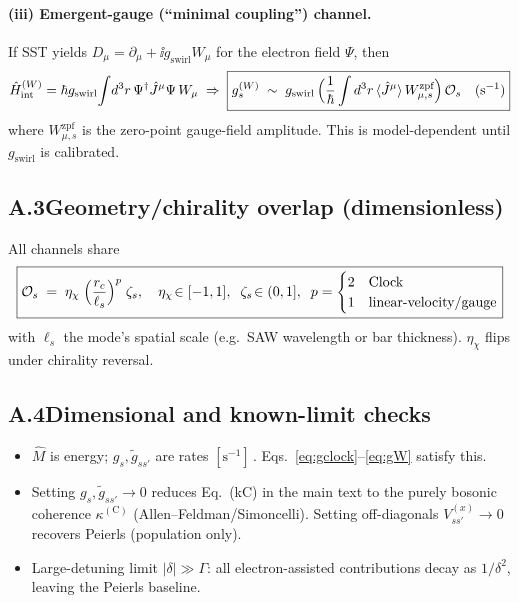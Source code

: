 \documentclass[aps,prb,preprint,amsmath,amssymb]{revtex4-2} %
\newcommand{\rc}{r_c}
\begin{document}
        \paragraph*{(iii) Emergent-gauge (“minimal coupling”) channel.}
            If SST yields \(D_\mu=\partial_\mu+\ii g_\textrm{swirl} W_\mu\) for the electron field \(\Psi\), then
            \begin{align}
                \hat H_\textrm{int}^{(W)}=\hbar g_\textrm{swirl}\!\int\! d^3r\,\Psi^\dagger \hat J^\mu \Psi\, W_\mu
                \;\Rightarrow\;
                \boxed{%
                    g_s^{(W)} \;\sim\; g_\textrm{swirl}\,\Big(\frac{1}{\hbar}\int d^3r\,\langle \hat J^\mu\rangle\,W^\textrm{zpf}_{\mu,s}\Big)\,\mathcal O_s \quad (\mathrm{s^{-1}})
                }\label{eq:gW}
            \end{align}
            where \(W^\textrm{zpf}_{\mu,s}\) is the zero-point gauge-field amplitude. This is model-dependent until \(g_\textrm{swirl}\) is calibrated.

    \subsection*{A.3\quad Geometry/chirality overlap (dimensionless)}
    All channels share
    \begin{align}
        \boxed{%
            \mathcal O_s \;=\; \eta_\chi \;\Big(\frac{\rc}{\ell_s}\Big)^{p}\;\zeta_s,\quad
            \eta_\chi\!\in[-1,1],\;\; \zeta_s\!\in(0,1],\;\; p=\begin{cases}2 & \text{Clock}\\ 1 & \text{linear-velocity/gauge}\end{cases}}
        \label{eq:overlap}
    \end{align}
    with \(\ell_s\) the mode’s spatial scale (e.g.\ SAW wavelength or bar thickness). \(\eta_\chi\) flips under chirality reversal.

    \subsection*{A.4\quad Dimensional and known-limit checks}
    \begin{itemize}
        \item \(\hat M\) is energy; \(g_s,\tilde g_{ss'}\) are rates \([\mathrm{s^{-1}}]\)\,. Eqs.~\eqref{eq:gclock}–\eqref{eq:gW} satisfy this.
        \item Setting \(g_s,\tilde g_{ss'}\!\to\!0\) reduces Eq.~(kC) in the main text to the purely bosonic coherence \(\kappa^{(\mathrm C)}\) (Allen–Feldman/Simoncelli). Setting off-diagonals \(V_{ss'}^{(x)}\!\to\!0\) recovers Peierls (population only).
        \item Large-detuning limit \(|\delta|\!\gg\!\Gamma\): all electron-assisted contributions decay as \(1/\delta^2\), leaving the Peierls baseline.
    \end{itemize}
\end{document}
